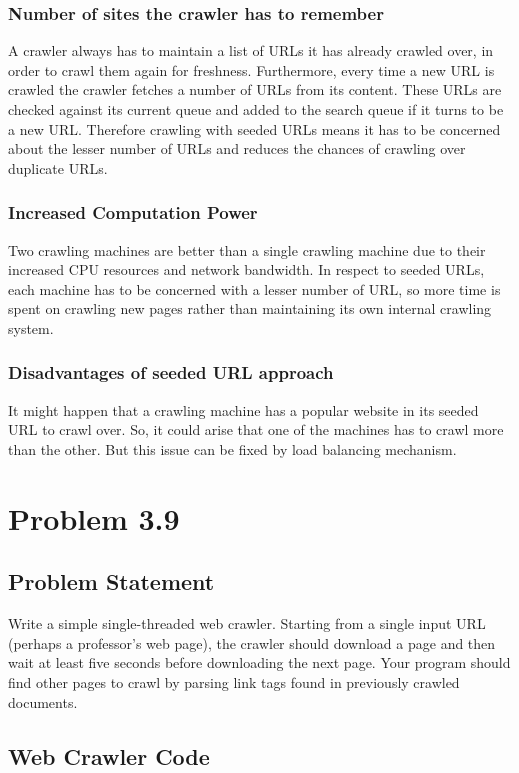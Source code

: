 \documentclass[12pt]{report}
\begin{document}
\subsection{Number of sites the crawler has to remember}
A crawler always has to maintain a list of URLs it has already crawled over, in order to crawl them again for freshness. Furthermore, every time a new URL is crawled the crawler fetches a number of URLs from its content. These URLs are checked against its current queue and added to the search queue if it turns to be a new URL. Therefore crawling with seeded URLs means it has to be concerned about the  lesser number of URLs and reduces the chances of crawling over duplicate URLs.
\subsection{Increased Computation Power}
Two crawling machines are better than a single crawling machine due to their increased CPU resources and network bandwidth. In respect to seeded URLs, each machine has to be concerned with a lesser number of URL, so more time is spent on crawling new pages rather than maintaining its own internal crawling system.
\subsection{Disadvantages of seeded URL approach}
It might happen that a crawling machine has a popular website in its seeded URL to crawl over. So, it could arise that one of the machines has to crawl more than the other. But this issue can be fixed by load balancing mechanism. 
\chapter{Problem 3.9}
\section{Problem Statement}
Write a simple single-threaded web crawler. Starting from a single input URL (perhaps a professor’s web page), the crawler should download a page and then wait at least five seconds before downloading the next page. Your program should find other pages to crawl by parsing link tags found in previously crawled documents.
\section{Web Crawler Code}

\end{document}
